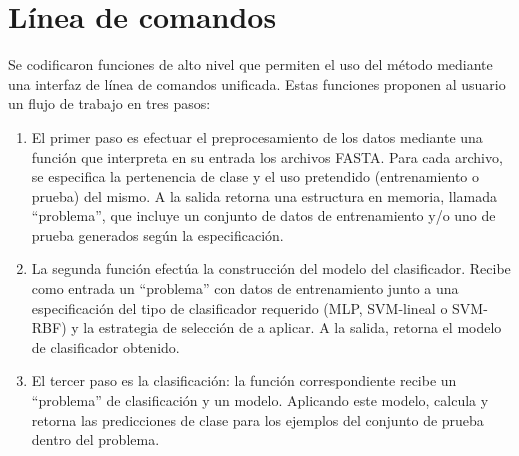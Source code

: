 %
%
%
\section{Línea de comandos}
%
Se codificaron funciones de alto nivel que permiten el uso del método
mediante una interfaz de línea de comandos unificada.
Estas funciones proponen al usuario un flujo de trabajo en tres pasos:
%
\begin{enumerate}
\item
  El primer paso es efectuar el preprocesamiento de los datos mediante
  una función que interpreta en su entrada los archivos FASTA.
  Para cada archivo, se especifica la pertenencia de clase y el uso
  pretendido (entrenamiento o prueba) del mismo.
  A la salida retorna una estructura en memoria, llamada ``problema'',
  que incluye un conjunto de datos de entrenamiento y/o uno de prueba
  generados según la especificación.
\item
  La segunda función efectúa la construcción del modelo del
  clasificador.
  Recibe como entrada un ``problema'' con datos de entrenamiento junto
  a una especificación del tipo de clasificador requerido (MLP,
  SVM-lineal o SVM-RBF) y la estrategia de selección de  a
  aplicar.
  A la salida, retorna el modelo de clasificador obtenido.
\item
  El tercer paso es la clasificación: la función correspondiente
  recibe un ``problema'' de clasificación y un modelo.
  Aplicando este modelo, calcula y retorna las predicciones de clase
  para los ejemplos del conjunto de prueba dentro del problema.
\end{enumerate}
%
